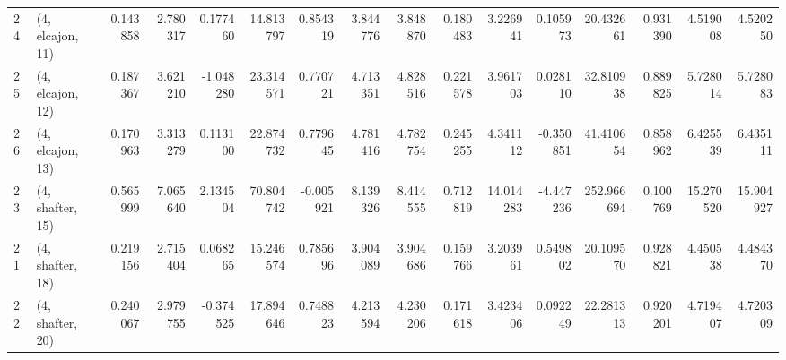 \begin{tabular}{llrrrrrrrrrrrrrr}
24 &  (4, elcajon, 11) &   0.143858 &  2.780317 &  0.177460 &  14.813797 &  0.854319 &   3.844776 &  3.848870 &  0.180483 &   3.226941 &   0.105973 &   20.432661 &  0.931390 &   4.519008 &   4.520250 \\
25 &  (4, elcajon, 12) &   0.187367 &  3.621210 & -1.048280 &  23.314571 &  0.770721 &   4.713351 &  4.828516 &  0.221578 &   3.961703 &   0.028110 &   32.810938 &  0.889825 &   5.728014 &   5.728083 \\
26 &  (4, elcajon, 13) &   0.170963 &  3.313279 &  0.113100 &  22.874732 &  0.779645 &   4.781416 &  4.782754 &  0.245255 &   4.341112 &  -0.350851 &   41.410654 &  0.858962 &   6.425539 &   6.435111 \\
23 &  (4, shafter, 15) &   0.565999 &  7.065640 &  2.134504 &  70.804742 & -0.005921 &   8.139326 &  8.414555 &  0.712819 &  14.014283 &  -4.447236 &  252.966694 &  0.100769 &  15.270520 &  15.904927 \\
21 &  (4, shafter, 18) &   0.219156 &  2.715404 &  0.068265 &  15.246574 &  0.785696 &   3.904089 &  3.904686 &  0.159766 &   3.203961 &   0.549802 &   20.109570 &  0.928821 &   4.450538 &   4.484370 \\
22 &  (4, shafter, 20) &   0.240067 &  2.979755 & -0.374525 &  17.894646 &  0.748823 &   4.213594 &  4.230206 &  0.171618 &   3.423406 &   0.092249 &   22.281313 &  0.920201 &   4.719407 &   4.720309 \\
\bottomrule
\end{tabular}
